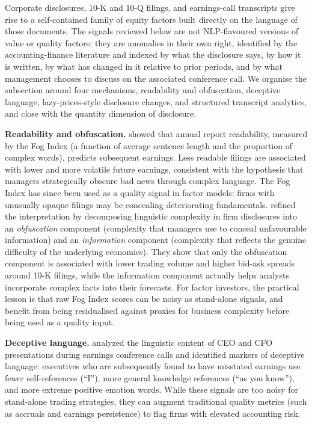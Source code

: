 Corporate disclosures, 10-K and 10-Q filings, and earnings-call transcripts give rise to a self-contained family of equity factors built directly on the language of those documents. The signals reviewed below are not NLP-flavoured versions of value or quality factors; they are anomalies in their own right, identified by the accounting-finance literature and indexed by what the disclosure says, by how it is written, by what has changed in it relative to prior periods, and by what management chooses to discuss on the associated conference call. We organise the subsection around four mechanisms, readability and obfuscation, deceptive language, lazy-prices-style disclosure changes, and structured transcript analytics, and close with the quantity dimension of disclosure.

\textbf{Readability and obfuscation.} \cite{li2008annual} showed that annual report readability, measured by the Fog Index (a function of average sentence length and the proportion of complex words), predicts subsequent earnings. Less readable filings are associated with lower and more volatile future earnings, consistent with the hypothesis that managers strategically obscure bad news through complex language. The Fog Index has since been used as a quality signal in factor models: firms with unusually opaque filings may be concealing deteriorating fundamentals. \cite{bushee2018linguistic} refined the interpretation by decomposing linguistic complexity in firm disclosures into an \textit{obfuscation} component (complexity that managers use to conceal unfavourable information) and an \textit{information} component (complexity that reflects the genuine difficulty of the underlying economics). They show that only the obfuscation component is associated with lower trading volume and higher bid-ask spreads around 10-K filings, while the information component actually helps analysts incorporate complex facts into their forecasts. For factor investors, the practical lesson is that raw Fog Index scores can be noisy as stand-alone signals, and benefit from being residualised against proxies for business complexity before being used as a quality input.

\textbf{Deceptive language.} \cite{larcker2012detecting} analyzed the linguistic content of CEO and CFO presentations during earnings conference calls and identified markers of deceptive language: executives who are subsequently found to have misstated earnings use fewer self-references (``I''), more general knowledge references (``as you know''), and more extreme positive emotion words. While these signals are too noisy for stand-alone trading strategies, they can augment traditional quality metrics (such as accruals and earnings persistence) to flag firms with elevated accounting risk.

